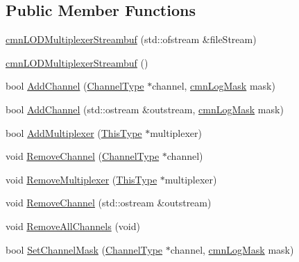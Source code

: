 \subsection*{Public Member Functions}
\begin{DoxyCompactItemize}
\item 
\hyperlink{classcmn_l_o_d_multiplexer_streambuf_aa1c3f01ca13437d1c457632be57e4900}{cmn\+L\+O\+D\+Multiplexer\+Streambuf} (std\+::ofstream \&file\+Stream)
\item 
\hyperlink{classcmn_l_o_d_multiplexer_streambuf_a0dc545e5ba6fda49610befbea04b211b}{cmn\+L\+O\+D\+Multiplexer\+Streambuf} ()
\item 
bool \hyperlink{classcmn_l_o_d_multiplexer_streambuf_a13062543394fee2e08419f0ecad3b5c1}{Add\+Channel} (\hyperlink{classcmn_l_o_d_multiplexer_streambuf_aa3b0347701c1aa5157a719978a1a6386}{Channel\+Type} $\ast$channel, \hyperlink{cmn_log_lo_d_8h_a44b6ef7560b0d204460b0a54f1a5d702}{cmn\+Log\+Mask} mask)
\item 
bool \hyperlink{classcmn_l_o_d_multiplexer_streambuf_a7aa3f784619695c5c32e7b475dc2b337}{Add\+Channel} (std\+::ostream \&outstream, \hyperlink{cmn_log_lo_d_8h_a44b6ef7560b0d204460b0a54f1a5d702}{cmn\+Log\+Mask} mask)
\item 
bool \hyperlink{classcmn_l_o_d_multiplexer_streambuf_a5cabf091e5c5dacea8052ea14d84686c}{Add\+Multiplexer} (\hyperlink{classcmn_l_o_d_multiplexer_streambuf_aa50efd43cb53bb6be746e3990e02452a}{This\+Type} $\ast$multiplexer)
\item 
void \hyperlink{classcmn_l_o_d_multiplexer_streambuf_ab1c5504083f7074b012335f38593f7c2}{Remove\+Channel} (\hyperlink{classcmn_l_o_d_multiplexer_streambuf_aa3b0347701c1aa5157a719978a1a6386}{Channel\+Type} $\ast$channel)
\item 
void \hyperlink{classcmn_l_o_d_multiplexer_streambuf_adc4afc63b900a50cd06fc5c330a7c04c}{Remove\+Multiplexer} (\hyperlink{classcmn_l_o_d_multiplexer_streambuf_aa50efd43cb53bb6be746e3990e02452a}{This\+Type} $\ast$multiplexer)
\item 
void \hyperlink{classcmn_l_o_d_multiplexer_streambuf_acd6d9a71c678728ce1e57ff05ddcc872}{Remove\+Channel} (std\+::ostream \&outstream)
\item 
void \hyperlink{classcmn_l_o_d_multiplexer_streambuf_a5d665f8abdc2561257af048146b80cdc}{Remove\+All\+Channels} (void)
\item 
bool \hyperlink{classcmn_l_o_d_multiplexer_streambuf_a963eadbf72872649aa91d2ab59d2c433}{Set\+Channel\+Mask} (\hyperlink{classcmn_l_o_d_multiplexer_streambuf_aa3b0347701c1aa5157a719978a1a6386}{Channel\+Type} $\ast$channel, \hyperlink{cmn_log_lo_d_8h_a44b6ef7560b0d204460b0a54f1a5d702}{cmn\+Log\+Mask} mask)

\end{DoxyCompactItemize}
